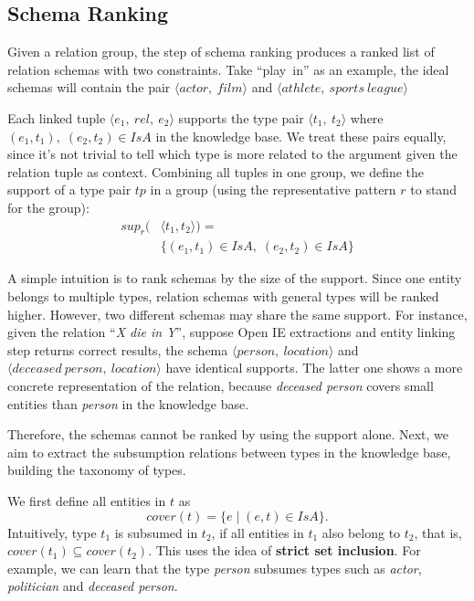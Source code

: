 \subsection{Schema Ranking}

Given a relation group, the step of schema ranking produces a ranked list of relation schemas with two constraints.
Take ``play\ in'' as an example, the ideal schemas will contain the pair
$\langle actor,\ film \rangle$ and
$\langle athlete,\ sports\ league \rangle$

Each linked tuple $\langle e_1,\ rel,\ e_2 \rangle$ supports the type pair $\langle t_1,\ t_2 \rangle$
where $(e_1, t_1),\; (e_2, t_2) \in IsA$ in the knowledge base. 
We treat these pairs equally, since it's not trivial to
tell which type is more related to the argument given the relation tuple as context.
Combining all tuples in one group, we define the support of a type pair $tp$
in a group (using the representative pattern $r$ to stand for the group):
\begin{equation}
\begin{aligned}
sup_{r}(&\langle t_1, t_2 \rangle) = \\
        &\{(e_1, t_1) \in IsA,\; (e_2, t_2) \in IsA \}
\end{aligned}
\end{equation}

A simple intuition is to rank schemas by the size of the support.
Since one entity belongs to multiple types, relation schemas with general types
will be ranked higher.
However, two different schemas may share the same support.
For instance, given the relation ``\textit{X die in Y}'', 
suppose Open IE extractions and entity linking step returns correct results,
the schema $\langle person,\ location \rangle$ and $\langle deceased\ person,\ location \rangle$ have identical supports.
The latter one shows a more concrete representation of the relation, because
\textit{deceased person} covers small entities than \textit{person} in the knowledge base.

Therefore, the schemas cannot be ranked by using the support alone.
Next, we aim to extract the subsumption relations between types in the knowledge base,
building the taxonomy of types.

We first define all entities in $t$ as
\begin{equation}
cover(t) = \{e\; |\; (e, t) \in IsA\}.
\end{equation}
Intuitively, type $t_1$ is subsumed in $t_2$, 
if all entities in $t_1$ also belong to $t_2$,
that is, $cover(t_1) \subseteq cover(t_2)$. This uses the idea of
\textbf{strict set inclusion}.
For example, we can learn that the type \textit{person} subsumes types such as
\textit{actor}, \textit{politician} and \textit{deceased person}.


